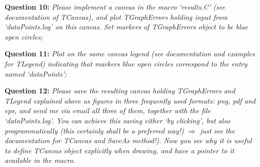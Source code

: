 \documentclass[11pt]{article}
\begin{document}
\bigskip

\noindent\textbf{Question 10:} {\it Please implement a canvas in the macro `results.C' (see documentation of TCanvas), and plot TGraphErrors holding input from `dataPoints.log' on this canvas. Set markers of TGraphErrors object to be blue open circles;}

\bigskip

\noindent\textbf{Question 11:} {\it Plot on the same canvas legend (see documentation and examples for TLegend) indicating that markers blue open circles correspond to the entry named `dataPoints';}

\bigskip

\noindent\textbf{Question 12:} {\it Please save the resulting canvas holding TGraphErrors and TLegend explained above as figures in three frequently used formats: png, pdf and eps, and send me via email all three of them, together with the file `dataPoints.log'. You can achieve this saving either `by clicking', but also programmatically (this certainly shall be a preferred way!) $\Rightarrow$ just see the documentation for TCanvas and SaveAs method!). Now you see why it is useful to define TCanvas object explicitly when drawing, and have a pointer to it available in the macro.}
\end{document}
